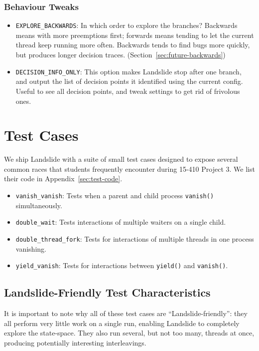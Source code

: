 \subsubsection{Behaviour Tweaks}
\begin{itemize}
	\small
	\item \texttt{EXPLORE\_BACKWARDS}: In which order to explore the branches? Backwards means with more preemptions first; forwards means tending to let the current thread keep running more often. Backwards tends to find bugs more quickly, but produces longer decision traces. (Section~\ref{sec:future-backwards})
	\item \texttt{DECISION\_INFO\_ONLY}: This option makes Landslide stop after one branch, and output the list of decision points it identified using the current config. Useful to see all decision points, and tweak settings to get rid of frivolous ones.
\end{itemize}

\section{Test Cases}
\label{sec:using-tests}

We ship Landslide with a suite of small test cases designed to expose several common races that students frequently encounter during 15-410 Project 3. We list their code in Appendix~\ref{sec:test-code}.

\begin{itemize}
        \item \texttt{vanish\_vanish}: Tests when a parent and child process \texttt{vanish()} simultaneously.
        \item \texttt{double\_wait}: Tests interactions of multiple waiters on a single child.
        \item \texttt{double\_thread\_fork}: Tests for interactions of multiple threads in one process vanishing.
        \item \texttt{yield\_vanish}: Tests for interactions between \texttt{yield()} and \texttt{vanish()}.
\end{itemize}

\subsection{Landslide-Friendly Test Characteristics}
\label{sec:using-landslide-friendly-tests}

It is important to note why all of these test cases are ``Landslide-friendly'': they all perform very little work on a single run, enabling Landslide to completely explore the state-space. They also run several, but not too many, threads at once, producing potentially interesting interleavings.
